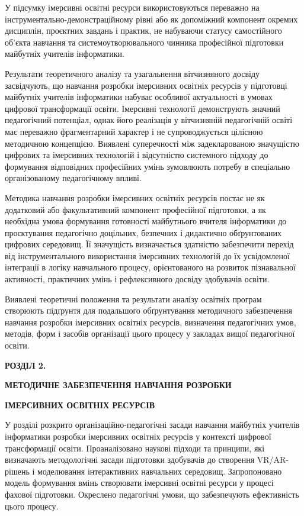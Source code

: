 У підсумку імерсивні освітні ресурси використовуються переважно на інструментально-демонстраційному рівні або як допоміжний компонент окремих дисциплін, проєктних завдань і практик, не набуваючи статусу самостійного об'єкта навчання та системоутворювального чинника професійної підготовки майбутніх учителів інформатики.

Результати теоретичного аналізу та узагальнення вітчизняного досвіду засвідчують, що навчання розробки імерсивних освітніх ресурсів у підготовці майбутніх учителів інформатики набуває особливої актуальності в умовах цифрової трансформації освіти. Імерсивні технології демонструють значний педагогічний потенціал, однак його реалізація у вітчизняній педагогічній освіті має переважно фрагментарний характер і не супроводжується цілісною методичною концепцією. Виявлені суперечності між задекларованою значущістю цифрових та імерсивних технологій і відсутністю системного підходу до формування відповідних професійних умінь зумовлюють потребу в спеціально організованому педагогічному впливі.

Методика навчання розробки імерсивних освітніх ресурсів постає не як додатковий або факультативний компонент професійної підготовки, а як необхідна умова формування готовності майбутнього вчителя інформатики до проєктування педагогічно доцільних, безпечних і дидактично обґрунтованих цифрових середовищ. Її значущість визначається здатністю забезпечити перехід від інструментального використання імерсивних технологій до їх усвідомленої інтеграції в логіку навчального процесу, орієнтованого на розвиток пізнавальної активності, практичних умінь і рефлексивного досвіду здобувачів освіти.

Виявлені теоретичні положення та результати аналізу освітніх програм створюють підґрунтя для подальшого обґрунтування методичного забезпечення навчання розробки імерсивних освітніх ресурсів, визначення педагогічних умов, методів, форм і засобів організації цього процесу у закладах вищої педагогічної освіти.

\textbf{\hfill\break
}

\textbf{РОЗДІЛ 2.}

\textbf{МЕТОДИЧНЕ ЗАБЕЗПЕЧЕННЯ НАВЧАННЯ РОЗРОБКИ}

\textbf{ІМЕРСИВНИХ ОСВІТНІХ РЕСУРСІВ}

У розділі розкрито організаційно-педагогічні засади навчання майбутніх учителів інформатики розробки імерсивних освітніх ресурсів у контексті цифрової трансформації освіти. Проаналізовано наукові підходи та принципи, які визначають методологічні засади підготовки здобувачів до створення VR/AR-рішень і моделювання інтерактивних навчальних середовищ. Запропоновано модель формування вмінь створювати імерсивні освітні ресурси у процесі фахової підготовки. Окреслено педагогічні умови, що забезпечують ефективність цього процесу.

